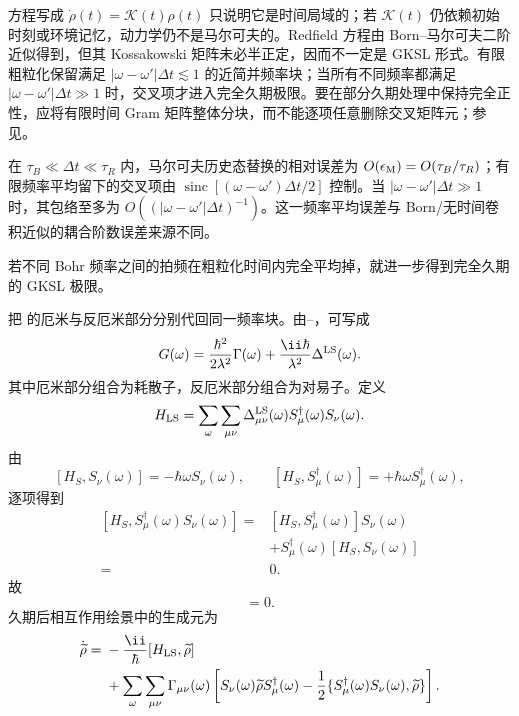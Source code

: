 方程写成 $\dot\rho(t)=\mathcal K(t)\rho(t)$ 只说明它是时间局域的；若 $\mathcal K(t)$ 仍依赖初始时刻或环境记忆，动力学仍不是马尔可夫的。Redfield 方程由 Born--马尔可夫二阶近似得到，但其 Kossakowski 矩阵未必半正定，因而不一定是 GKSL 形式。有限粗粒化保留满足 $|\omega-\omega'|\Delta t\lesssim1$ 的近简并频率块；当所有不同频率都满足 $|\omega-\omega'|\Delta t\gg1$ 时，交叉项才进入完全久期极限。要在部分久期处理中保持完全正性，应将有限时间 Gram 矩阵整体分块，而不能逐项任意删除交叉矩阵元；参见。

在 $\tau_B\ll\Delta t\ll\tau_R$ 内，马尔可夫历史态替换的相对误差为 $O(\epsilon_{\rm M})=O(\tau_B/\tau_R)$；有限频率平均留下的交叉项由 $\operatorname{sinc}[(\omega-\omega')\Delta t/2]$ 控制。当 $|\omega-\omega'|\Delta t\gg1$ 时，其包络至多为 $O((|\omega-\omega'|\Delta t)^{-1})$。这一频率平均误差与 Born/无时间卷积近似的耦合阶数误差来源不同。

若不同 Bohr 频率之间的拍频在粗粒化时间内完全平均掉，就进一步得到完全久期的 GKSL 极限。

把 的厄米与反厄米部分分别代回同一频率块。由--，可写成
\[
G(\omega)
=\frac{\hbar^2}{2\lambda^2}\Gamma(\omega)
+\frac{\ii\hbar}{\lambda^2}\Delta^{\rm LS}(\omega).
\]
其中厄米部分组合为耗散子，反厄米部分组合为对易子。定义
\begin{equation}
H_{\rm LS}
=\sum_\omega\sum_{\mu\nu}
\Delta_{\mu\nu}^{\rm LS}(\omega)
S_\mu^\dagger(\omega)S_\nu(\omega).
\label{eq:phys-oqs-hls-general}
\end{equation}
由
\[
[H_S,S_\nu(\omega)]=-\hbar\omega S_\nu(\omega),
\qquad
[H_S,S_\mu^\dagger(\omega)]=+\hbar\omega S_\mu^\dagger(\omega),
\]
逐项得到
\[
\begin{aligned}
[H_S,S_\mu^\dagger(\omega)S_\nu(\omega)]
={}&[H_S,S_\mu^\dagger(\omega)]S_\nu(\omega)\\
&+S_\mu^\dagger(\omega)[H_S,S_\nu(\omega)]\\
={}&0.
\end{aligned}
\]
故
\begin{equation}
[H_S,H_{\rm LS}]=0.
\label{eq:phys-oqs-hls-commutes}
\end{equation}
久期后相互作用绘景中的生成元为
\begin{equation}
\begin{aligned}
\dot{\widetilde\rho}
={}&-\frac{\ii}{\hbar}[H_{\rm LS},\widetilde\rho]\\
&+\sum_\omega\sum_{\mu\nu}
\Gamma_{\mu\nu}(\omega)
\left[
S_\nu(\omega)\widetilde\rho S_\mu^\dagger(\omega)
-\frac12\{S_\mu^\dagger(\omega)S_\nu(\omega),\widetilde\rho\}
\right].
\end{aligned}
\label{eq:phys-oqs-gksl-interaction-picture}
\end{equation}

